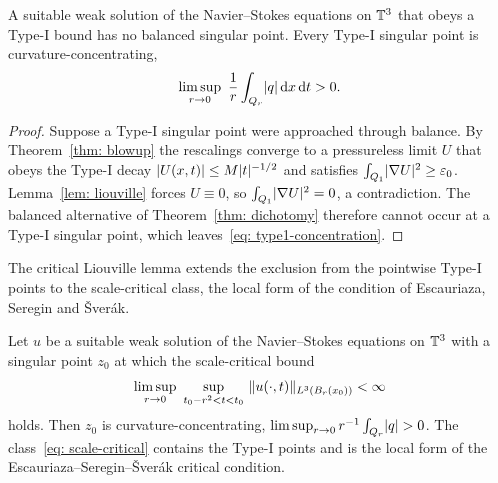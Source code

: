\begin{theorem}\label{thm: no-balanced}
A suitable weak solution of the
Navier--Stokes equations on $\mathbb{T}^3$ that obeys a Type-I bound has no balanced
singular point. Every Type-I singular point is curvature-concentrating,
\begin{equation}\label{eq: type1-concentration}
  \limsup_{r\to0}\ \frac{1}{r}\int_{Q_r}\lvert q \rvert\,\mathrm{d} x\,\mathrm{d} t > 0.
\end{equation}
\end{theorem}

\begin{proof}
Suppose a Type-I singular point were approached through balance. By
Theorem~\ref{thm: blowup} the rescalings converge to a pressureless limit $U$ that
obeys the Type-I decay $\lvert U(x,t) \rvert \le M\lvert t \rvert^{-1/2}$ and satisfies
$\int_{Q_1}\lvert \nabla U \rvert^2 \ge \varepsilon_0$. Lemma~\ref{lem: liouville} forces
$U\equiv0$, so $\int_{Q_1}\lvert \nabla U \rvert^2 = 0$, a contradiction. The balanced
alternative of Theorem~\ref{thm: dichotomy} therefore cannot occur at a Type-I
singular point, which leaves~\eqref{eq: type1-concentration}.
\end{proof}

The critical Liouville lemma extends the exclusion from the pointwise Type-I points
to the scale-critical class, the local form of the condition of Escauriaza, Seregin
and \v{S}ver\'ak.

\begin{theorem}\label{thm: no-balanced-critical}
Let $u$ be a suitable weak solution
of the Navier--Stokes equations on $\mathbb{T}^3$ with a singular point $z_0$ at which the
scale-critical bound
\begin{equation}\label{eq: scale-critical}
  \limsup_{r\to0}\ \sup_{t_0-r^2<t<t_0}\ \norm{u(\cdot,t)}_{L^3(B_r(x_0))}
  < \infty
\end{equation}
holds. Then $z_0$ is curvature-concentrating,
$\limsup_{r\to0} r^{-1}\int_{Q_r}\lvert q \rvert > 0$. The class~\eqref{eq: scale-critical}
contains the Type-I points and is the local form of the
Escauriaza--Seregin--\v{S}ver\'ak critical condition.
\end{theorem}

